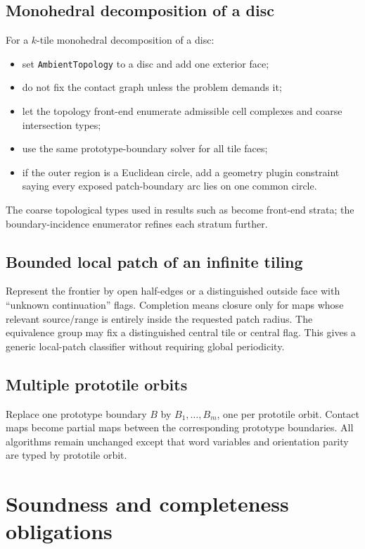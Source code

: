 \documentclass[11pt]{article}
\begin{document}
\subsection{Monohedral decomposition of a disc}

For a $k$-tile monohedral decomposition of a disc:
\begin{itemize}
  \item set \texttt{AmbientTopology} to a disc and add one exterior face;
  \item do not fix the contact graph unless the problem demands it;
  \item let the topology front-end enumerate admissible cell complexes and coarse intersection types;
  \item use the same prototype-boundary solver for all tile faces;
  \item if the outer region is a Euclidean circle, add a geometry plugin constraint saying every exposed patch-boundary arc lies on one common circle.
\end{itemize}
The coarse topological types used in results such as \cite{BasitLangi2024} become front-end strata; the boundary-incidence enumerator refines each stratum further.

\subsection{Bounded local patch of an infinite tiling}

Represent the frontier by open half-edges or a distinguished outside face with ``unknown continuation'' flags.  Completion means closure only for maps whose relevant source/range is entirely inside the requested patch radius.  The equivalence group may fix a distinguished central tile or central flag.  This gives a generic local-patch classifier without requiring global periodicity.

\subsection{Multiple prototile orbits}

Replace one prototype boundary $B$ by $B_1,\ldots,B_m$, one per prototile orbit.  Contact maps become partial maps between the corresponding prototype boundaries.  All algorithms remain unchanged except that word variables and orientation parity are typed by prototile orbit.

\section{Soundness and completeness obligations}
\end{document}
